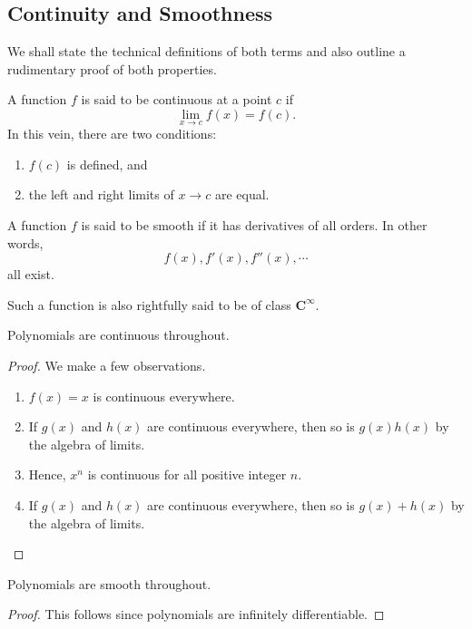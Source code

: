 \documentclass[../jarvis.tex]{subfiles}
\begin{document}
\subsection{Continuity and Smoothness}
We shall state the technical definitions of both terms and also outline a rudimentary proof of both properties.
\begin{definition}[Continuity]
    A function $f$ is said to be continuous at a point $c$ if 
    $$\lim_{x\rightarrow c}f(x)=f(c).$$
    In this vein, there are two conditions:
    \begin{enumerate}
        \item $f(c)$ is defined, and
        \item the left and right limits of $x\rightarrow c$ are equal.
    \end{enumerate}
\end{definition}
\begin{definition}[Smoothness]
    A function $f$ is said to be smooth if it has derivatives of all orders. In other words,
    $$f(x),f'(x),f''(x),\cdots$$
    all exist. 
    
    Such a function is also rightfully said to be of class $\mathbf{C}^{\infty}.$
\end{definition}
\begin{proposition}
    Polynomials are continuous throughout.
\end{proposition}
\begin{proof}
    We make a few observations.
    \begin{enumerate}
        \item $f(x)=x$ is continuous everywhere.
        \item If $g(x)$ and $h(x)$ are continuous everywhere, then so is $g(x)h(x)$ by the algebra of limits.
        \item Hence, $x^n$ is continuous for all positive integer $n$.
        \item If $g(x)$ and $h(x)$ are continuous everywhere, then so is $g(x)+h(x)$ by the algebra of limits.
    \end{enumerate}
\end{proof}
\begin{proposition}
    Polynomials are smooth throughout.
\end{proposition}
\begin{proof}
    This follows since polynomials are infinitely differentiable.
\end{proof}
\end{document}
